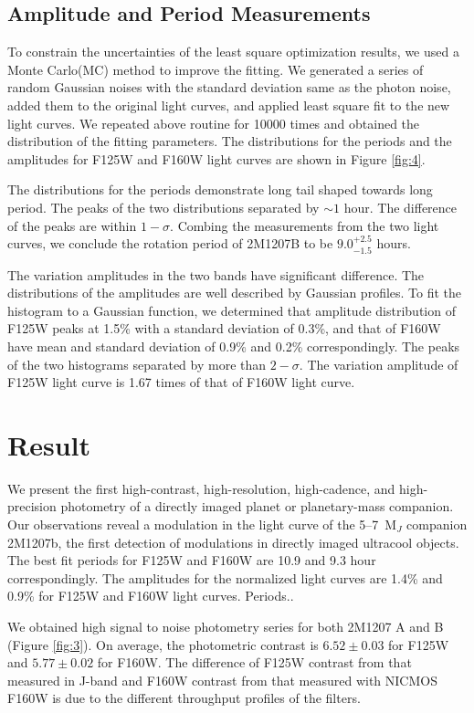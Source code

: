 \documentclass[apj]{emulateapj}
\begin{document}
\subsection{Amplitude and Period Measurements}

To constrain the uncertainties of the least square optimization
results, we used a Monte Carlo(MC) method to improve the fitting. We
generated a series of random Gaussian noises with the standard deviation same as
the photon noise, added them to the original light curves, and applied
least square fit to the new light curves. We repeated above routine for 10000 times and obtained
the distribution of the fitting parameters. The distributions for the
periods and the amplitudes for F125W and F160W light curves are
shown in Figure \ref{fig:4}.

The distributions for the periods demonstrate long tail shaped towards
long period. The peaks of the two distributions separated by $\sim 1$
hour. The difference of the peaks are within $1-\sigma$. Combing the
measurements from the two light curves, we conclude the rotation period
of 2M1207B to be $9.0_{-1.5}^{+2.5}$ hours.

The variation amplitudes in the two bands have significant
difference. The distributions of the amplitudes are well described by
Gaussian profiles. To fit the histogram to a Gaussian function, we
determined that amplitude distribution of F125W peaks at 1.5\% with a
standard deviation of 0.3\%, and that of F160W have mean and standard
deviation of 0.9\% and 0.2\% correspondingly. The peaks of the two
histograms separated by more than $2-\sigma$. The variation amplitude
of F125W light curve is 1.67 times of that of F160W light curve.

\section{Result}

We present the first high-contrast, high-resolution, high-cadence, and high-precision photometry of a directly imaged planet or planetary-mass companion. Our observations reveal a modulation in the light curve of the 5--7~M$_{J}$ companion 2M1207b, the first detection of modulations in directly imaged ultracool objects.  The best fit periods for F125W and F160W are 10.9 and 9.3 hour correspondingly. The amplitudes for the normalized light curves are 1.4\% and 0.9\% for F125W and F160W light curves. Periods..

We obtained high signal to noise photometry series for both 2M1207 A
and B (Figure \ref{fig:3}). On average, the photometric contrast is $6.52\pm0.03$ for
F125W and $5.77\pm0.02$ for F160W. The difference of F125W contrast
from that measured in J-band \citep{Mohanty2007} and
F160W contrast from that measured with NICMOS F160W 
\citep{Song2006} is due to the different throughput profiles of the
filters.
\end{document}
